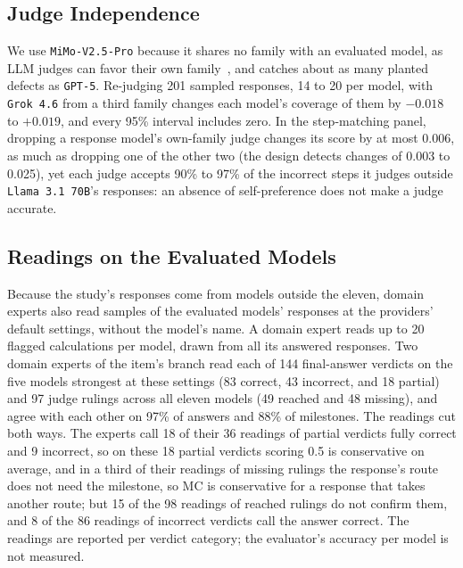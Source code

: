 \subsection{Judge Independence}

We use \texttt{MiMo-V2.5-Pro} because it shares no family with an evaluated model, as LLM judges can
favor their own family~\citep{panickssery2024selfrecognition, li2026preferenceleakage}, and catches
about as many planted defects as \texttt{GPT-5}.
Re-judging 201 sampled responses, 14 to 20 per model, with \texttt{Grok 4.6} from a third family
changes each model's coverage of them by $-0.018$ to $+0.019$, and every 95\% interval includes
zero.
In the step-matching panel, dropping a response model's own-family judge changes its score by at
most 0.006, as much as dropping one of the other two (the design detects changes of 0.003 to
0.025), yet each judge accepts 90\% to 97\% of the incorrect steps it judges outside
\texttt{Llama 3.1 70B}'s responses: an absence of self-preference does not make a judge accurate.

\subsection{Readings on the Evaluated Models}
\label{appendix:readings}

Because the study's responses come from models outside the eleven, domain experts also read samples
of the evaluated models' responses at the providers' default settings, without the model's name.
A domain expert reads up to 20 flagged calculations per model, drawn from all its answered
responses.
Two domain experts of the item's branch read each of 144 final-answer verdicts on the five models
strongest at these settings (83 correct, 43 incorrect, and 18 partial) and 97 judge rulings across
all eleven models (49 reached and 48 missing), and agree with each other on 97\% of answers and
88\% of milestones.
The readings cut both ways.
The experts call 18 of their 36 readings of partial verdicts fully correct and 9 incorrect, so
on these 18 partial verdicts scoring 0.5 is conservative on average, and in a third of their
readings of missing rulings the response's route does not need the milestone, so MC is
conservative for a response that takes another route; but 15 of the 98 readings of reached rulings
do not confirm them, and 8 of the 86 readings of incorrect verdicts call the answer correct.
The readings are reported per verdict category; the evaluator's accuracy per model is not measured.

